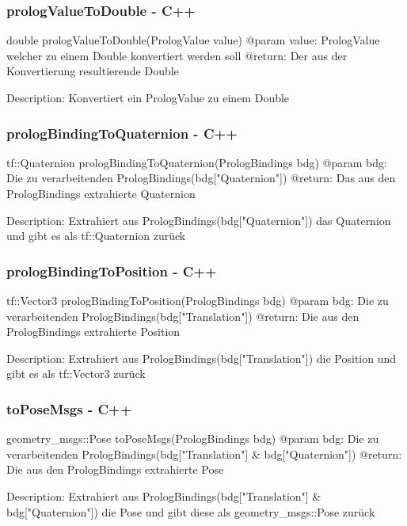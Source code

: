 \documentclass{suturo}
\begin{document}
\subsubsection{prologValueToDouble - C++}
\begin{spverbatim}
double prologValueToDouble(PrologValue value)
@param value: PrologValue welcher zu einem Double konvertiert werden soll
@return: Der aus der Konvertierung resultierende Double 

Description: Konvertiert ein PrologValue zu einem Double
\end{spverbatim}

\subsubsection{prologBindingToQuaternion - C++}
\begin{spverbatim}
tf::Quaternion prologBindingToQuaternion(PrologBindings bdg)
@param bdg: Die zu verarbeitenden PrologBindings(bdg["Quaternion"])
@return: Das aus den PrologBindings extrahierte Quaternion

Description: Extrahiert aus PrologBindings(bdg["Quaternion"]) das Quaternion und gibt es
als tf::Quaternion zurück
\end{spverbatim}


\subsubsection{prologBindingToPosition - C++}
\begin{spverbatim}
tf::Vector3 prologBindingToPosition(PrologBindings bdg)
@param bdg: Die zu verarbeitenden PrologBindings(bdg["Translation"])
@return: Die aus den PrologBindings extrahierte Position

Description: Extrahiert aus PrologBindings(bdg["Translation"]) die Position und gibt es als tf::Vector3 zurück
\end{spverbatim}

\subsubsection{toPoseMsgs - C++}
\begin{spverbatim}
geometry_msgs::Pose toPoseMsgs(PrologBindings bdg)
@param bdg: Die zu verarbeitenden PrologBindings(bdg["Translation"] & bdg["Quaternion"])
@return: Die aus den PrologBindings extrahierte Pose

Description: Extrahiert aus PrologBindings(bdg["Translation"] & bdg["Quaternion"]) die Pose und gibt diese als geometry_msgs::Pose zurück
\end{spverbatim}
\end{document}
